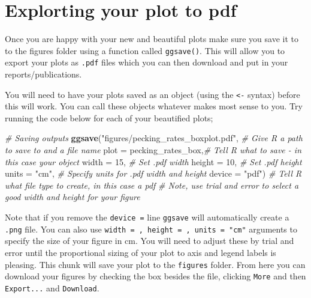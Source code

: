 \documentclass[
]{book}
\newenvironment{Shaded}{\begin{snugshade}}{\end{snugshade}}
\newcommand{\AttributeTok}[1]{\textcolor[rgb]{0.13,0.29,0.53}{#1}}
\newcommand{\CommentTok}[1]{\textcolor[rgb]{0.56,0.35,0.01}{\textit{#1}}}
\newcommand{\DecValTok}[1]{\textcolor[rgb]{0.00,0.00,0.81}{#1}}
\newcommand{\FunctionTok}[1]{\textcolor[rgb]{0.13,0.29,0.53}{\textbf{#1}}}
\newcommand{\NormalTok}[1]{#1}
\newcommand{\StringTok}[1]{\textcolor[rgb]{0.31,0.60,0.02}{#1}}
\begin{document}
\hypertarget{explorting-your-plot-to-pdf}{%
\section{Explorting your plot to pdf}\label{explorting-your-plot-to-pdf}}

Once you are happy with your new and beautiful plots make sure you save it to to the figures folder using a function called \texttt{ggsave()}. This will allow you to export your plots as \texttt{.pdf} files which you can then download and put in your reports/publications.

You will need to have your plots saved as an object (using the \texttt{\textless{}-} syntax) before this will work. You can call these objects whatever makes most sense to you. Try running the code below for each of your beautified plots;

\begin{Shaded}
\begin{Highlighting}[]
\CommentTok{\# Saving outputs}
\FunctionTok{ggsave}\NormalTok{(}\StringTok{"figures/pecking\_rates\_boxplot.pdf"}\NormalTok{, }\CommentTok{\# Give R a path to save to and a file name}
       \AttributeTok{plot =}\NormalTok{ pecking\_rates\_box,}\CommentTok{\# Tell R what to save {-} in this case your object}
       \AttributeTok{width =} \DecValTok{15}\NormalTok{, }\CommentTok{\# Set .pdf width}
       \AttributeTok{height =} \DecValTok{10}\NormalTok{, }\CommentTok{\# Set .pdf height}
       \AttributeTok{units =} \StringTok{"cm"}\NormalTok{, }\CommentTok{\# Specify units for .pdf width and height}
       \AttributeTok{device =} \StringTok{"pdf"}\NormalTok{) }\CommentTok{\# Tell R what file type to create, in this case a pdf}
\CommentTok{\# Note, use trial and error to select a good width and height for your figure}
\end{Highlighting}
\end{Shaded}

Note that if you remove the \texttt{device\ =} line \texttt{ggsave} will automatically create a \texttt{.png} file. You can also use \texttt{width\ =\ ,\ height\ =\ ,\ units\ =\ "cm"} arguments to specify the size of your figure in cm. You will need to adjust these by trial and error until the proportional sizing of your plot to axis and legend labels is pleasing. This chunk will save your plot to the \texttt{figures} folder. From here you can download your figures by checking the box besides the file, clicking \texttt{More} and then \texttt{Export...} and \texttt{Download}.
\end{document}
